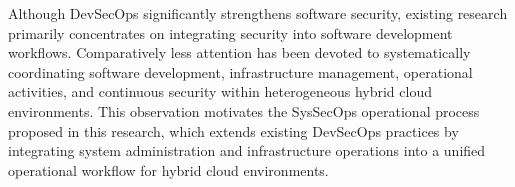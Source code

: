 Although DevSecOps significantly strengthens software security, existing research primarily concentrates on integrating security into software development workflows. Comparatively less attention has been devoted to systematically coordinating software development, infrastructure management, operational activities, and continuous security within heterogeneous hybrid cloud environments. This observation motivates the SysSecOps operational process proposed in this research, which extends existing DevSecOps practices by integrating system administration and infrastructure operations into a unified operational workflow for hybrid cloud environments.